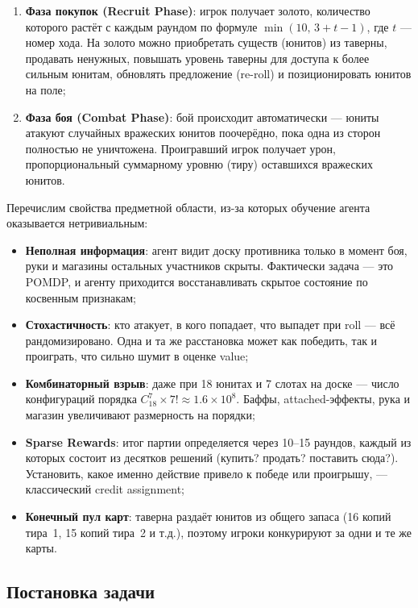 \documentclass[a4paper,12pt]{extarticle}
\begin{document}
\begin{enumerate}[noitemsep]
  \item \textbf{Фаза покупок (Recruit Phase)}: игрок получает золото, количество которого растёт с каждым раундом по формуле $\min(10,\, 3 + t - 1)$, где $t$ --- номер хода. На золото можно приобретать существ (юнитов) из таверны, продавать ненужных, повышать уровень таверны для доступа к более сильным юнитам, обновлять предложение (re-roll) и позиционировать юнитов на поле;
  \item \textbf{Фаза боя (Combat Phase)}: бой происходит автоматически --- юниты атакуют случайных вражеских юнитов поочерёдно, пока одна из сторон полностью не уничтожена. Проигравший игрок получает урон, пропорциональный суммарному уровню (тиру) оставшихся вражеских юнитов.
\end{enumerate}

Перечислим свойства предметной области, из-за которых обучение агента оказывается нетривиальным:

\begin{itemize}[noitemsep]
  \item \textbf{Неполная информация}: агент видит доску противника только в момент боя, руки и магазины остальных участников скрыты. Фактически задача --- это POMDP, и агенту приходится восстанавливать скрытое состояние по косвенным признакам;
  \item \textbf{Стохастичность}: кто атакует, в кого попадает, что выпадет при roll --- всё рандомизировано. Одна и та же расстановка может как победить, так и проиграть, что сильно шумит в оценке value;
  \item \textbf{Комбинаторный взрыв}: даже при 18 юнитах и 7 слотах на доске --- число конфигураций порядка $C_{18}^{7} \times 7! \approx 1.6 \times 10^{8}$. Баффы, attached-эффекты, рука и магазин увеличивают размерность на порядки;
  \item \textbf{Sparse Rewards}: итог партии определяется через 10--15 раундов, каждый из которых состоит из десятков решений (купить? продать? поставить сюда?). Установить, какое именно действие привело к победе или проигрышу, --- классический credit assignment;
  \item \textbf{Конечный пул карт}: таверна раздаёт юнитов из общего запаса (16 копий тира~1, 15 копий тира~2 и т.д.), поэтому игроки конкурируют за одни и те же карты.
\end{itemize}

\subsection{Постановка задачи}
\end{document}
